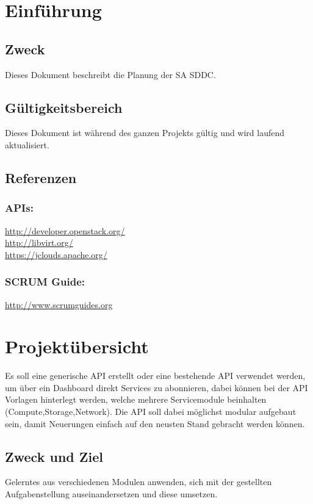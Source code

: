 \documentclass[11pt]{scrartcl}
\begin{document}
\newpage
\tableofcontents
\newpage

\section{Einführung}
\subsection{Zweck}
Dieses Dokument beschreibt die Planung der SA SDDC.
\subsection{Gültigkeitsbereich}
Dieses Dokument ist während des ganzen Projekts gültig und wird laufend aktualisiert.

\subsection{Referenzen}
\subsubsection{APIs:} \href{http://developer.openstack.org/}{http://developer.openstack.org/} 
\\
\href{http://libvirt.org/}{http://libvirt.org/} \\
\href{https://jclouds.apache.org/}{https://jclouds.apache.org/}
\subsubsection{SCRUM Guide:} 
\href{http://www.scrumguides.org/docs/scrumguide/v1/Scrum-Guide-DE.pdf}{http://www.scrumguides.org}
\section{Projektübersicht}
Es soll eine generische API erstellt oder eine bestehende API verwendet werden, um über ein 
Dashboard direkt Services zu abonnieren, dabei können bei der API Vorlagen 
hinterlegt werden, welche mehrere Servicemodule beinhalten 
(Compute,Storage,Network).
Die API soll dabei möglichst modular aufgebaut sein, damit Neuerungen einfach 
auf den neusten Stand gebracht werden können.
\subsection{Zweck und Ziel}
 Gelerntes aus verschiedenen Modulen anwenden, sich mit der gestellten 
 Aufgabenstellung auseinandersetzen 
 und diese umsetzen.
\end{document}
